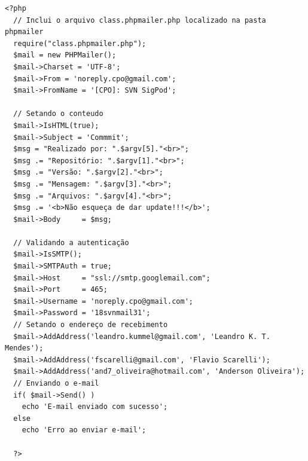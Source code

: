 \documentclass[a4paper,10pt]{article}
\begin{document}
\begin{lstlisting}[caption={Algoritmo de envio de email}]
  <?php
  // Inclui o arquivo class.phpmailer.php localizado na pasta phpmailer
  require("class.phpmailer.php");
  $mail = new PHPMailer();
  $mail->Charset = 'UTF-8';
  $mail->From = 'noreply.cpo@gmail.com';
  $mail->FromName = '[CPO]: SVN SigPod';
  
  // Setando o conteudo
  $mail->IsHTML(true);
  $mail->Subject = 'Commmit';
  $msg = "Realizado por: ".$argv[5]."<br>";
  $msg .= "Repositório: ".$argv[1]."<br>";
  $msg .= "Versão: ".$argv[2]."<br>";
  $msg .= "Mensagem: ".$argv[3]."<br>";
  $msg .= "Arquivos: ".$argv[4]."<br>";
  $msg .= '<b>Não esqueça de dar update!!!</b>';
  $mail->Body     = $msg;
  
  // Validando a autenticação
  $mail->IsSMTP();
  $mail->SMTPAuth = true;
  $mail->Host     = "ssl://smtp.googlemail.com";
  $mail->Port     = 465;
  $mail->Username = 'noreply.cpo@gmail.com';
  $mail->Password = '18svnmail31';
  // Setando o endereço de recebimento
  $mail->AddAddress('leandro.kummel@gmail.com', 'Leandro K. T. Mendes');
  $mail->AddAddress('fscarelli@gmail.com', 'Flavio Scarelli');
  $mail->AddAddress('and7_oliveira@hotmail.com', 'Anderson Oliveira');
  // Enviando o e-mail
  if( $mail->Send() )
    echo 'E-mail enviado com sucesso';
  else
    echo 'Erro ao enviar e-mail';
  
  ?>
\end{lstlisting}
\end{document}
